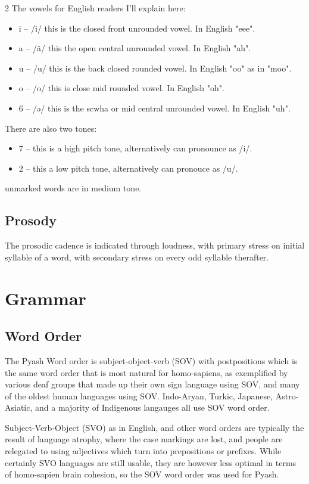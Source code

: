 \documentclass[10pt,pagesize]{article}
\providecommand{\tightlist}{%
  \setlength{\itemsep}{0pt}\setlength{\parskip}{0pt}}
\begin{document}
\begin{multicols}{2}
The vowels for English readers I'll explain here:
  \begin{itemize}\tightlist
    \item i -- /i/ this is the closed front unrounded vowel. In English "eee".
    \item a -- /ä/ this the open central unrounded vowel. In English "ah". 
    \item u -- /u/ this is the back closed rounded vowel. In English "oo" as in "moo". 
    \item o -- /o/ this is close mid rounded vowel. In English "oh". 
    \item 6 -- /ə/ this is the scwha or mid central unrounded vowel. In English "uh".
  \end{itemize}
There are also two tones:
  \begin{itemize}\tightlist
    \item 7 -- this is a high pitch tone, alternatively can pronounce as /i/.
    \item 2 -- this a low pitch tone, alternatively can pronouce as /u/.
  \end{itemize}
unmarked words are in medium tone. 

\subsection{Prosody}

The prosodic cadence is indicated through loudness, with primary stress on initial syllable of a word, with secondary stress on every odd syllable therafter.

\section{Grammar}
  \subsection{Word Order}
  The Pyash Word order is subject-object-verb (SOV) with postpositions 
  which is the same word order that is most natural for homo-sapiens, 
  as exemplified by various deaf groups that made up their own sign language 
  using SOV, and many of the oldest human languages using SOV. Indo-Aryan, 
  Turkic, Japanese, Astro-Asiatic, and a majority of Indigenous langauges all 
  use SOV word order. 

  Subject-Verb-Object (SVO) as in English, and other word 
  orders are typically the result of 
  language atrophy, where the case markings are lost, and people are relegated
  to using adjectives which turn into prepositions or prefixes.  While certainly
  SVO languages are still usable, they are however less optimal in terms of
  homo-sapien brain cohesion, so the SOV word order was used for Pyash. 


\end{multicols}
\end{document}
